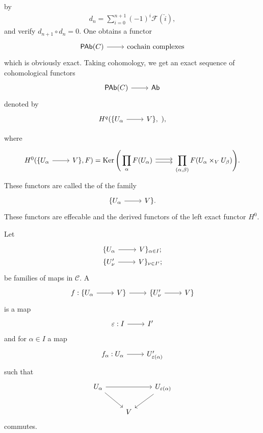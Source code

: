 \documentclass [11 pt, oneside] {article}
\begin{document}
by
\begin{align*}
	d_{n} = \sum_{i=0}^{n+1} (-1) ^{i}\mathscr{F}(\widehat{i}),
\end{align*}
and verify $d_{n+1}\circ d_{n}=0$. One obtains a functor 
\[
\begin{tikzcd}
	\catn{PAb}(\mathscr{C}) \ar[r]& \textrm{cochain complexes}	
\end{tikzcd}
\]
which is obviously exact.
Taking cohomology, we get an exact sequence of cohomological functors
\[
\begin{tikzcd}
	\catn{PAb}(\mathscr{C}) \ar[r]& \catn{Ab}
\end{tikzcd}
\]
denoted by
\[
\begin{tikzcd}
	H^{q}(\{U_{\alpha}\ar[r]& V\},\ ),
\end{tikzcd}
\]

where
\[
\begin{tikzcd}
        H^{0}(\{U_{\alpha}\ar[r]& V\}, \mathscr{F}) = \displaystyle \Ker \Bigg( \prod_{\alpha}\mathscr{F}(U_{\alpha}) \ar[r,shift left = 0.5 ex]\ar[r,shift right =0.5 ex] & \displaystyle \prod_{(\alpha,\beta)} \mathscr{F}(U_{\alpha}\times_{V}U_{\beta})\Bigg).
\end{tikzcd}
\]
These functors are called the  of the family
\[
\begin{tikzcd}
	\{U_\alpha \ar[r]& V\}.
\end{tikzcd}
\]
These functors are effecable and the derived functors of the left exact functor $H^0$.

\begin{definition}\label{i_3.3}\text{}
Let 
\[
\begin{tikzcd}[row sep = 0 pt]
	\{U_{\alpha}\ar[r]& V\}_{\alpha\in I};\\
	\{U'_{\nu}\ar[r]& V\}_{\nu\in I'};
\end{tikzcd}
\]
be families of maps in $\mathscr{C}$.
A  
\[
\begin{tikzcd}
	f: \{U_{\alpha}\ar[r]& V\}\ar[r]& \{U'_{\nu}\ar[r]& V\}
\end{tikzcd}
\]
is a map
\[
\begin{tikzcd}
	\eps : I\ar[r]& I'
\end{tikzcd}
\]
and for $\alpha\in I$ a map
\[
\begin{tikzcd}
	f_{\alpha} : U_{\alpha} \ar[r]& U'_{\eps(\alpha)}
\end{tikzcd}
\]
such that
\[
\begin{tikzcd}
	U_{\alpha}\ar[rr]\ar[dr]&&U_{\eps(\alpha)} \ar[dl]\\
				&V
\end{tikzcd}
\]
commutes.


\end{definition}
\end{document}
